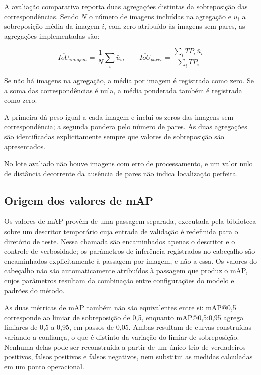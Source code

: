 A avalia\c{c}\~ao comparativa reporta duas agrega\c{c}\~oes distintas da sobreposi\c{c}\~ao das correspond\^encias. Sendo $N$ o n\'umero de imagens inclu\'idas na agrega\c{c}\~ao e $\bar{u}_i$ a sobreposi\c{c}\~ao m\'edia da imagem $i$, com zero atribu\'ido \`as imagens sem pares, as agrega\c{c}\~oes implementadas s\~ao:

\begin{equation}
  \overline{\mathit{IoU}}_{imagem} = \frac{1}{N}\sum_i \bar{u}_i, \qquad
  \overline{\mathit{IoU}}_{pares} = \frac{\sum_i TP_i\,\bar{u}_i}{\sum_i TP_i}
  \label{eq:iou-agregacoes}
\end{equation}

Se n\~ao h\'a imagens na agrega\c{c}\~ao, a m\'edia por imagem \'e registrada como zero. Se a soma das correspond\^encias \'e nula, a m\'edia ponderada tamb\'em \'e registrada como zero.

A primeira d\'a peso igual a cada imagem e inclui os zeros das imagens sem correspond\^encia; a segunda pondera pelo n\'umero de pares. As duas agrega\c{c}\~oes s\~ao identificadas explicitamente sempre que valores de sobreposi\c{c}\~ao s\~ao apresentados.

No lote avaliado n\~ao houve imagens com erro de processamento, e um valor nulo de dist\^ancia decorrente da aus\^encia de pares n\~ao indica localiza\c{c}\~ao perfeita.

\subsection{Origem dos valores de mAP}
\label{sec:origem-valores-map}

Os valores de mAP prov\^em de uma passagem separada, executada pela biblioteca sobre um descritor tempor\'ario cuja entrada de valida\c{c}\~ao \'e redefinida para o diret\'orio de teste. Nessa chamada s\~ao encaminhados apenas o descritor e o controle de verbosidade; os par\^ametros de infer\^encia registrados no cabe\c{c}alho s\~ao encaminhados explicitamente \`a passagem por imagem, e n\~ao a essa. Os valores do cabe\c{c}alho n\~ao s\~ao automaticamente atribu\'idos \`a passagem que produz o mAP, cujos par\^ametros resultam da combina\c{c}\~ao entre configura\c{c}\~oes do modelo e padr\~oes do m\'etodo.

As duas m\'etricas de mAP tamb\'em n\~ao s\~ao equivalentes entre si: mAP@0,5 corresponde ao limiar de sobreposi\c{c}\~ao de 0,5, enquanto mAP@0,5:0,95 agrega limiares de 0,5 a 0,95, em passos de 0,05. Ambas resultam de curvas constru\'idas variando a confian\c{c}a, o que \'e distinto da varia\c{c}\~ao do limiar de sobreposi\c{c}\~ao. Nenhuma delas pode ser reconstru\'ida a partir de um \'unico trio de verdadeiros positivos, falsos positivos e falsos negativos, nem substitui as medidas calculadas em um ponto operacional.

